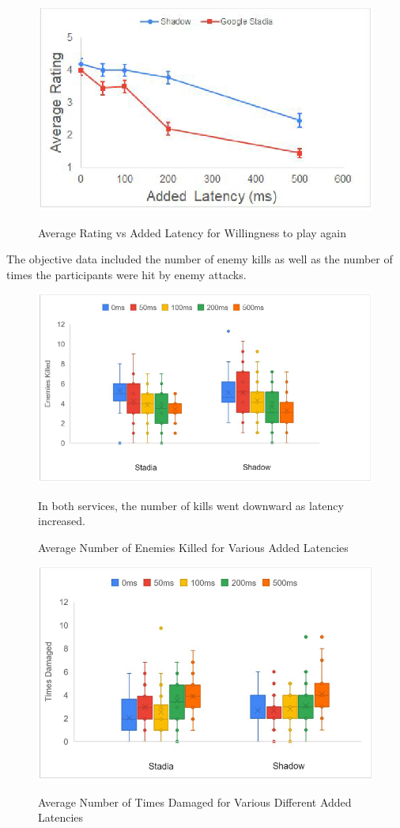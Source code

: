 \begin{figure}[H]
	\centering
	\includegraphics[width=12cm]{../img/fig15.png}
	\caption{Average Rating vs Added Latency for Willingness to play again}
	\parencite[Section 4.2.2, Page 37, Figure 15]{desveaux2020effects}
\end{figure}
The objective data \parencite[Section 4.2.3, Page 39]{desveaux2020effects} included the number of enemy kills as well as the number of times the participants were hit by enemy attacks.
\begin{figure}[H]
	\centering
	\includegraphics[width=12cm]{../img/fig16.png}
	\caption{Average Number of Enemies Killed for Various Added Latencies}
	In both services, the number of kills went downward as latency increased.\\
	\parencite[Section 4.2.3, Page 40, Figure 16]{desveaux2020effects}
\end{figure}
\begin{figure}[H]
	\centering
	\includegraphics[width=12cm]{../img/fig17.png}
	\caption{Average Number of Times Damaged for Various Different Added Latencies}
	\parencite[Section 4.2.3, Page 40, Figure 17]{desveaux2020effects}
\end{figure}
